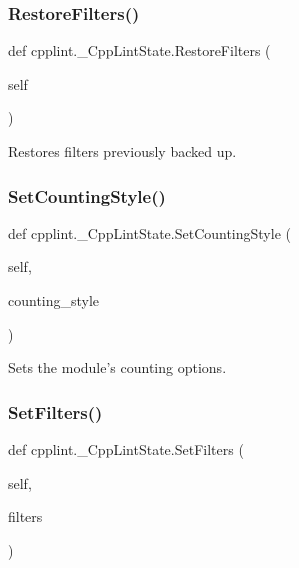 \subsubsection{\texorpdfstring{Restore\+Filters()}{RestoreFilters()}}
{\footnotesize\ttfamily def cpplint.\+\_\+\+Cpp\+Lint\+State.\+Restore\+Filters (\begin{DoxyParamCaption}\item[{}]{self }\end{DoxyParamCaption})}

\begin{DoxyVerb}Restores filters previously backed up.\end{DoxyVerb}
 \mbox{\label{classcpplint_1_1__CppLintState_ac2503f2d8a357edd3ca648d219c7317e}} 
\subsubsection{\texorpdfstring{Set\+Counting\+Style()}{SetCountingStyle()}}
{\footnotesize\ttfamily def cpplint.\+\_\+\+Cpp\+Lint\+State.\+Set\+Counting\+Style (\begin{DoxyParamCaption}\item[{}]{self,  }\item[{}]{counting\+\_\+style }\end{DoxyParamCaption})}

\begin{DoxyVerb}Sets the module's counting options.\end{DoxyVerb}
 \mbox{\label{classcpplint_1_1__CppLintState_a359d4516eac0c1dce6223cf18181ac80}} 
\subsubsection{\texorpdfstring{Set\+Filters()}{SetFilters()}}
{\footnotesize\ttfamily def cpplint.\+\_\+\+Cpp\+Lint\+State.\+Set\+Filters (\begin{DoxyParamCaption}\item[{}]{self,  }\item[{}]{filters }\end{DoxyParamCaption})}

